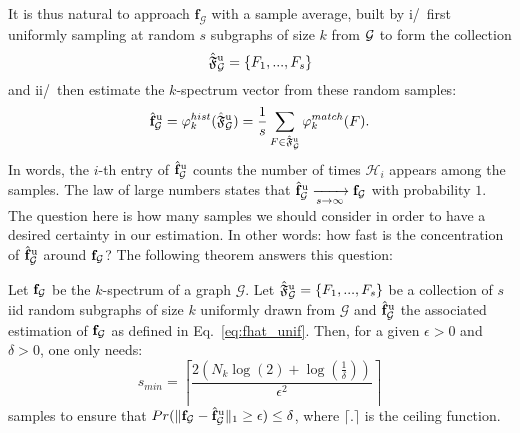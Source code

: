 It is thus natural to approach $\mathbf{f}_\mathcal{G}$ with a sample average, built by i/~first uniformly sampling at random $s$ subgraphs of size $k$ from $\mathcal{G}$ to form the collection 
$$\hat{\mathfrak{F}}^{\rm u}_{\mathcal{G}}=\{F_1,...,F_s\}$$
and ii/~then estimate the $k$-spectrum vector from these random samples:
\begin{align}
	\label{eq:fhat_unif}
	\hat{\mathbf{f}}_\mathcal{G}^{\rm u} = \varphi_k^{hist}(\hat{\mathfrak{F}}^{\rm u}_{\mathcal{G}})= \frac{1}{s}\sum_{F\in\hat{\mathfrak{F}}^{\rm u}_{\mathcal{G}}} \varphi^{match}_k(F).
\end{align}
In words, the $i$-th entry of $\hat{\mathbf{f}}^{\rm u}_\mathcal{G}$ counts the number of times $\mathcal{H}_i$ appears among the samples. 
The law of large numbers states that $\hat{\mathbf{f}}^{\rm u}_{\mathcal{G}} \xrightarrow[s \to \infty]{} \mathbf{f}_\mathcal{G}$ with probability $1$.
The question here is how many samples we should consider in order to have a desired certainty in our estimation. In other words: how fast is the concentration of $\hat{\mathbf{f}}^{\rm u}_{\mathcal{G}}$ around $\mathbf{f}_{\mathcal{G}}$? The following theorem answers this question:%
\begin{theorem}
	\label{thm:norm1}
	Let $\mathbf{f}_{\mathcal{G}}$ be the $k$-spectrum of a graph $\mathcal{G}$. Let $\hat{\mathfrak{F}}^{\rm u}_{\mathcal{G}}=\{F_1,...,F_{s}\}$ be a collection of $s$ iid random subgraphs of size $k$ uniformly drawn from $\mathcal{G}$ and $\hat{\mathbf{f}}^{\rm u}_{\mathcal{G}}$ the associated estimation of $\mathbf{f}_{\mathcal{G}}$ as defined in Eq.~\eqref{eq:fhat_unif}. Then, for a given $\epsilon>0$ and $\delta >0$, one only needs:
	\begin{equation}
	s_{min}=\left \lceil \frac{2(N_k\log(2)+\log(\frac{1}{\delta} ))}{\epsilon^2} \right \rceil
	\end{equation}
	samples to ensure that $Pr(\| \mathbf{f}_{\mathcal{G}}-\hat{\mathbf{f}}^{\rm u}_\mathcal{G} \|_1 \geq \epsilon )\leq\delta$, where $\lceil.\rceil$ is the ceiling function.
\end{theorem}

